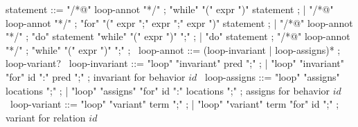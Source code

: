 \begin{syntax}
  statement ::= "/*@" loop-annot "*/" ;
  "while" "(" expr ")" statement ;
  | "/*@" loop-annot "*/" ;
  "for" "(" expr ";" expr ";" expr ")" statement ;
  | "/*@" loop-annot "*/" ;
  "do" statement "while" "(" expr ")" ";" ;
  | "do" statement ;
  "/*@" loop-annot "*/" ;
  "while" "(" expr ")" ";" ; \experimental
  \
  loop-annot ::= (loop-invariant | loop-assigns)* ;
  loop-variant?
  \
  loop-invariant ::= "loop" "invariant" pred ";" ;
  | "loop" "invariant" "for" id ":" pred ";" ; invariant for behavior $id$
  \
  loop-assigns ::= "loop" "assigns" locations ";" ;
  | "loop" "assigns" "for" id ":" locations ";" ; assigns for behavior $id$
  \
  loop-variant ::= "loop" "variant" term ";" ;
  | "loop" "variant" term "for" id ";" ; variant for relation $id$
  \
\end{syntax}
